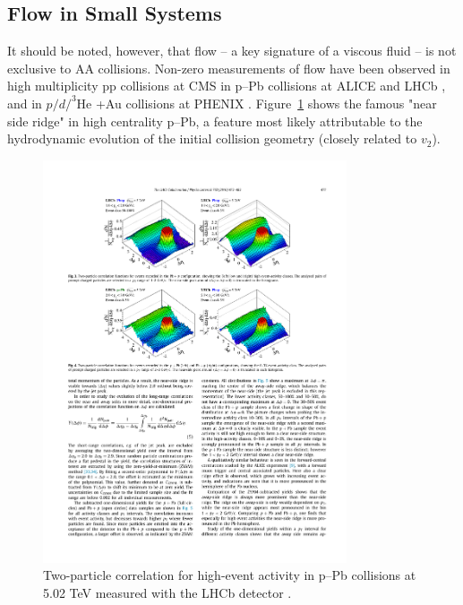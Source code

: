 
\subsection{Flow in Small Systems}

It should be noted, however, that flow -- a key signature of a viscous fluid -- is not exclusive to AA collisions. Non-zero measurements of flow have been observed in high multiplicity pp collisions at CMS \cite{Khachatryan2010} in p--Pb collisions at ALICE and LHCb \cite{Abelev2013,Aaij2016}, and in $p/d/^3$He +Au collisions at PHENIX \cite{PHENIXCollaboration2018}. Figure~\ref{fig:near_side_ridge} shows the famous "near side ridge" in high centrality p--Pb, a feature most likely attributable to the hydrodynamic evolution of the initial collision geometry (closely related to $v_2$).

\begin{figure}[htpb]
  \centering
  \includegraphics[width=0.8\textwidth]{Introduction/near_side_ridge.pdf}
  \caption{Two-particle correlation for high-event activity in p–Pb collisions at 5.02 TeV measured with the LHCb detector \cite{Aaij2016}.}
  \label{fig:near_side_ridge}
\end{figure}

